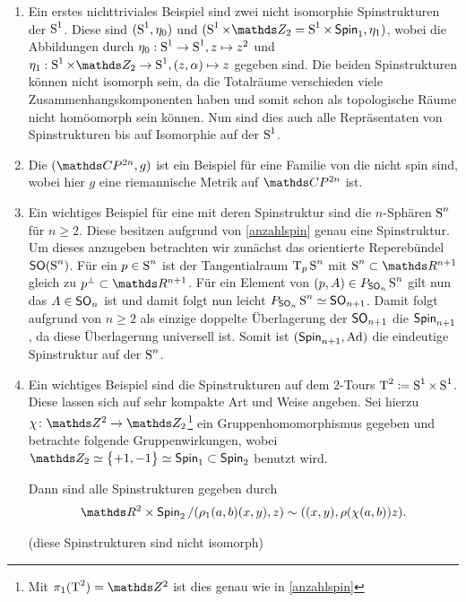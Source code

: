 \begin{Bsp}
\begin{enumerate}[(1)]
  \item \label{Bsp:spinstrukturAufsphere} Ein erstes nichttriviales Beispiel sind zwei nicht isomorphie
    Spinstrukturen der $\S^1$. Diese sind $(\S^1 , \eta_0)$ und
    $(\S^1 \times \Z_2 = \S^1 \times \spin_1 , \eta_1)$, wobei die
    Abbildungen durch $\eta_0 : \S^1 \rightarrow \S^1 , z \mapsto z^2$
    und
    $\eta_1 : \S^1 \times \Z_2 \rightarrow \S^1 , (z,\alpha) \mapsto
    z$
    gegeben sind. Die beiden Spinstrukturen können nicht isomorph
    sein, da die Totalräume verschieden viele Zusammenhangskomponenten
    haben und somit schon als topologische Räume nicht homöomorph sein
    können. Nun sind dies auch alle Repräsentaten von
    Spinstrukturen bis auf Isomorphie auf der $ \S^1 $.
  \item Die $(\CP^{2n},g)$ ist ein Beispiel für eine Familie von
    \RMFen die nicht spin sind, wobei hier $g$ eine riemannische
    Metrik auf $\CP^{2n}$ ist.  
    
  \item \label{SpinstrSphäre}Ein wichtiges Beispiel für eine \RMF mit deren Spinstruktur
    sind die $ n $-Sphären $\S^n$ für $ n \geq 2 $. Diese besitzen  
    aufgrund von \cref{anzahlspin} genau eine Spinstruktur. Um 
    dieses anzugeben betrachten wir zunächst das orientierte Reperebündel $ \so(\S^n) $. Für ein $ p\in\S^n $ ist der Tangentialraum $ \tang{p}{\S^n} $ mit $ \S^n\subset\R^{n+1} $ 
    gleich zu $ p^\bot\subset\R^{n+1} $. Für ein Element von $ (p,A)\in \Ph{\so_n}{\S^n} $ gilt nun das $ A \in\so_n$ ist und damit folgt
    nun leicht $ \Ph{\so_n}{\S^n} \simeq \so_{n+1} $. Damit folgt
    aufgrund von $ n\geq 2 $ als einzige doppelte Überlagerung der
    $ \so_{n+1} $ die $ \spin_{n+1} $, da diese Überlagerung universell ist. Somit ist $ (\spin_{n+1},\Ad) $ die eindeutige
    Spinstruktur auf der $ \S^n $.
  \item Ein wichtiges Beispiel sind die Spinstrukturen auf dem $ 2 $-Tours $ \TT^2 \coloneqq \S^1\times\S^1$. Diese lassen sich auf sehr
  kompakte Art und Weise angeben.
  Sei hierzu $ \abb{\chi}{\Z^2}{\Z_2}$\footnote{Mit $ \pi_1(\TT^2)=\Z^2 $ ist dies genau wie in \cref{anzahlspin}} ein Gruppenhomomorphismus gegeben
  und betrachte folgende Gruppenwirkungen, wobei $ \Z_2\simeq\sset{+1,-1}\simeq\spin_1 \subset\spin_2 $ benutzt wird.


  Dann sind alle Spinstrukturen gegeben durch  
  \begin{gather*}
  	\R^2 \times \spin_2 / (\rho_1(a,b)(x,y),z) \sim ((x,y),\rho(\chi(a,b))z).
  \end{gather*}
  \begin{smallproof}(diese Spinstrukturen sind nicht isomorph)
  \end{smallproof}
  
	\end{enumerate}
\end{Bsp}

